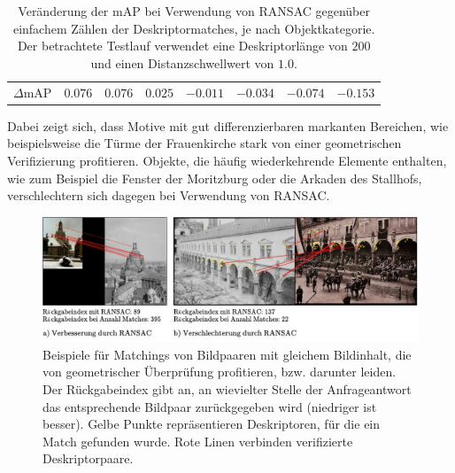 \begin{table}[]
{\begin{tabular}{cccccccc}
\large{$\Delta$mAP} & \large{$0.076$} & \large{$0.076$} & \large{$0.025$} & \large{$-0.011$} & \large{$-0.034$} & \large{$-0.074$} & \large{$-0.153$}\\              
\end{tabular}
}
\setlength\tabcolsep{6pt}
\caption{Veränderung der mAP bei Verwendung von RANSAC gegenüber einfachem Zählen der Deskriptormatches, je nach Objektkategorie. Der betrachtete Testlauf verwendet eine Deskriptorlänge von $200$ und einen Distanzschwellwert von $1.0$.}
\label{scoring_mAP_change_by_category}
\end{table}
Dabei zeigt sich, dass Motive mit gut differenzierbaren markanten Bereichen, wie beispielsweise die Türme der Frauenkirche stark von einer geometrischen Verifizierung profitieren. Objekte, die häufig wiederkehrende Elemente enthalten, wie zum Beispiel die Fenster der Moritzburg oder die Arkaden des Stallhofs, verschlechtern sich dagegen bei Verwendung von RANSAC.
\\
\begin{figure}[h]
\includegraphics[scale=0.595]{where_ransac_shines}
\caption{Beispiele für Matchings von Bildpaaren mit gleichem Bildinhalt, die von geometrischer Überprüfung profitieren, bzw. darunter leiden. Der Rückgabeindex gibt an, an wievielter Stelle der Anfrageantwort das entsprechende Bildpaar zurückgegeben wird (niedriger ist besser). Gelbe Punkte repräsentieren Deskriptoren, für die ein Match gefunden wurde. Rote Linen verbinden verifizierte Deskriptorpaare.}
\label{where_ransac_shines}
\end{figure}

